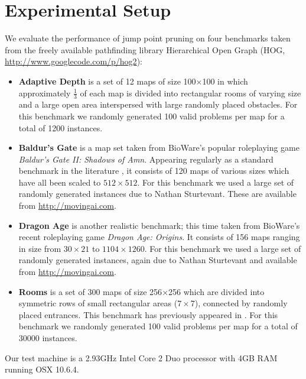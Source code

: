 \section{Experimental Setup}
We evaluate the performance of jump point pruning on four benchmarks taken from the freely
available pathfinding library Hierarchical Open Graph
(HOG, \url{http://www.googlecode.com/p/hog2}): 
\begin{itemize}

\item{\textbf{Adaptive Depth}
is a set of 12 maps of size 100$\times$100 in which approximately $\frac{1}{3}$
of each map is divided into rectangular rooms of varying size and a large
open area interspersed with large randomly placed obstacles.
For this benchmark we randomly generated 100 valid problems per map for a 
total of 1200 instances.
} 

\item{\textbf{Baldur's Gate} is a map set taken from BioWare's popular
roleplaying game \emph{Baldur's Gate II: Shadows of Amn}.
Appearing regularly as a standard benchmark in the literature
\cite{bjornsson06,harabor10,pochter10}, 
it consists of 120 maps of various sizes which have all been scaled to
$512\times512$. 
For this benchmark we used a large set of randomly generated instances due to
Nathan Sturtevant. These are available from \url{http://movingai.com}.
}

\item{\textbf{Dragon Age} is another realistic benchmark; this time taken from
BioWare's recent roleplaying game \emph{Dragon Age: Origins}.
It consists of 156 maps ranging in size 
from $30\times21$ to $1104\times1260$.
For this benchmark we used a large set of randomly generated instances,
again due to Nathan Sturtevant and available from \url{http://movingai.com}.
}

\item{\textbf{Rooms} is a set of 300 maps of size
256$\times$256 which are divided into symmetric rows of small rectangular areas
($7\times7$), connected by randomly placed entrances. This benchmark has
previously appeared in \cite{pochter10}.
For this benchmark we randomly generated 100 valid problems per map for a 
total of 30000 instances.
}
\end{itemize}

Our test machine is a 2.93GHz Intel Core 2 Duo processor with 4GB RAM running OSX 
10.6.4.  
